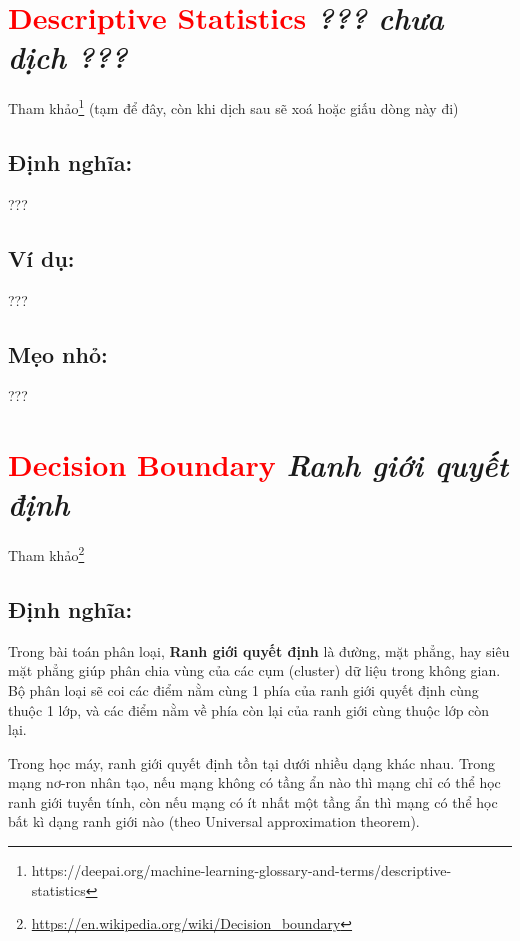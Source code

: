 \section*{\huge \textcolor{Red}{Descriptive Statistics}  \small \textit{??? chưa dịch ???} }
Tham khảo\footnote{https://deepai.org/machine-learning-glossary-and-terms/descriptive-statistics} (tạm để đây, còn khi dịch sau sẽ xoá hoặc giấu dòng này đi)
\subsection*{Định nghĩa:}
???
\subsection*{Ví dụ:}
???
\subsection*{Mẹo nhỏ:}
???
\section*{\huge \textcolor{Red}{Decision Boundary}  \small \textit{Ranh giới quyết định} }
Tham khảo\footnote{\url{https://en.wikipedia.org/wiki/Decision_boundary}}
\subsection*{Định nghĩa:}
Trong bài toán phân loại, \textbf{Ranh giới quyết định} là đường, mặt phẳng, hay siêu mặt phẳng giúp phân chia vùng của các cụm (cluster) dữ liệu trong không gian.
Bộ phân loại sẽ coi các điểm nằm cùng 1 phía của ranh giới quyết định cùng thuộc 1 lớp, và các điểm nằm về phía còn lại của ranh giới cùng thuộc lớp còn lại.

Trong học máy, ranh giới quyết định tồn tại dưới nhiều dạng khác nhau.
Trong mạng nơ-ron nhân tạo, nếu mạng không có tầng ẩn nào thì mạng chỉ có thể học ranh giới tuyến tính, còn nếu mạng có ít nhất một tầng ẩn thì mạng có thể học bất kì dạng ranh giới nào (theo Universal approximation theorem).
